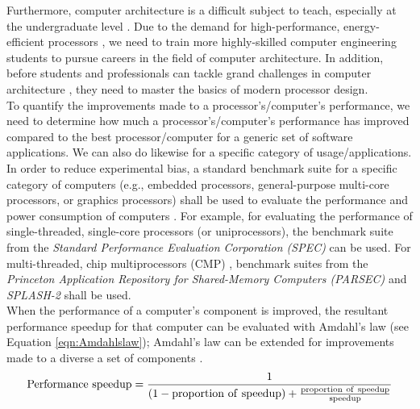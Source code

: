 Furthermore, computer architecture is a difficult subject to teach, especially at the undergraduate level \cite{Yurcik2002}. Due to the demand for high-performance, energy-efficient processors \cite{Duranton2013}, we need to train more highly-skilled computer engineering students to pursue careers in the field of computer architecture. In addition, before students and professionals can tackle grand challenges in computer architecture \cite{Track2014}, they need to master the basics of modern processor design. \\

To quantify the improvements made to a processor's/computer's performance, we need to determine how much a processor's/computer's performance has improved compared to the best processor/computer for a generic set of software applications. We can also do likewise for a specific category of usage/applications. In order to reduce experimental bias, a standard benchmark suite for a specific category of computers (e.g., embedded processors, general-purpose multi-core processors, or graphics processors) shall be used to evaluate the performance and power consumption of computers \cite{Bertozzi2009}. For example, for evaluating the performance of single-threaded, single-core processors (or uniprocessors), the benchmark suite from the {\it Standard Performance Evaluation Corporation (SPEC)} \cite{SPEC2014} can be used. For multi-threaded, chip multiprocessors (CMP) \cite{Olukotun2007}, benchmark suites from the {\it Princeton Application Repository for Shared-Memory Computers (PARSEC)} \cite{Bienia2011,CSPrinceton2010} and {\it SPLASH-2} \cite{Venetis2007} shall be used. \\

When the performance of a computer's component is improved, the resultant performance speedup for that computer can be evaluated with Amdahl's law \cite{Hennessy2012} (see Equation \ref{eqn:Amdahlslaw}); Amdahl's law can be extended for improvements made to a diverse a set of components \cite{Shen2005a}.
\begin{equation}
\label{eqn:Amdahlslaw}
{\rm Performance\ speedup} = \frac{1}{(1 - {\rm proportion\ of\ speedup}) + \frac{\rm proportion\ of\ speedup}{\rm speedup}}
\end{equation}

